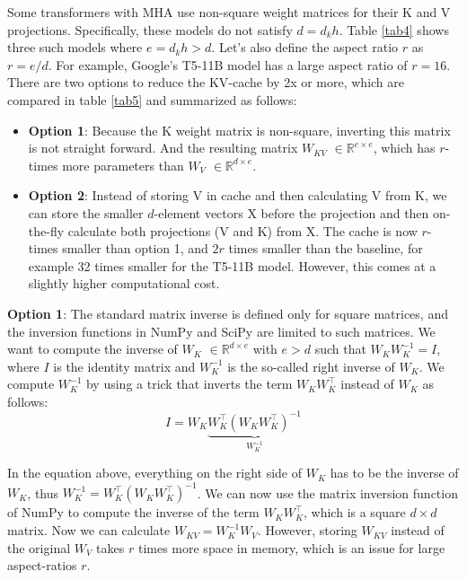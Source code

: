 \documentclass{article}
\newcommand{\eR}[2]{$\in \mathbb{R}^{#1 \times #2}$} %
\begin{document}
Some transformers with MHA use non-square weight matrices for their K and V projections. Specifically, these models do not satisfy $d = d_k h$. Table \ref{tab4} shows three such models where $e = d_k h > d$. Let’s also define the aspect ratio $r$ as $r = e/d$. For example, Google’s T5-11B model has a large aspect ratio of $r = 16$. There are two options to reduce the KV-cache by 2x or more, which are compared in table \ref{tab5} and summarized as follows:
\begin{itemize}[topsep=-1pt]
  \item \textbf{Option 1}: Because the K weight matrix is non-square, inverting this matrix is not straight forward. And the resulting matrix $W_{KV}$ \eR{e}{e}, which has $r$-times more parameters than $W_V$ \eR{d}{e}.
  \item \textbf{Option 2}: Instead of storing  V in cache and then calculating V from K, we can store the smaller $d$-element vectors X before the projection and then on-the-fly calculate both projections (V and K) from X. The cache is now $r$-times smaller than option 1, and $2r$ times smaller than the baseline, for example 32 times smaller for the T5-11B model. However, this comes at a slightly higher computational cost.
\end{itemize}

\textbf{Option 1}: The standard matrix inverse is defined only for square matrices, and the inversion functions in NumPy and SciPy are limited to such matrices. We want to compute the inverse of $W_K$ \eR{d}{e} with $e > d$ such that $W_K W_K^{-1} = I$, where $I$ is the identity matrix and $W_K^{-1}$ is the so-called right inverse of $W_K$. We compute $W_K^{-1}$ by using a trick that inverts the term $W_K W_K^\top$ instead of $W_K$ as follows:
\begin{equation*}
  I = W_K \underbrace{W_K^\top (W_K W_K^\top)^{-1}}_{W_K^{-1}}
\end{equation*}

In the equation above, everything on the right side of $W_K$ has to be the inverse of $W_K$, thus $W_K^{-1} = W_K^\top (W_K W_K^\top)^{-1}$. We can now use the matrix inversion function of NumPy to compute the inverse of the term $W_K W_K^\top$, which is a square $d \times d$ matrix. Now we can calculate $W_{KV} = W_K^{-1} W_V$. However, storing $W_{KV}$ instead of the original $W_V$ takes $r$ times more space in memory, which is an issue for large aspect-ratios $r$.
\end{document}

